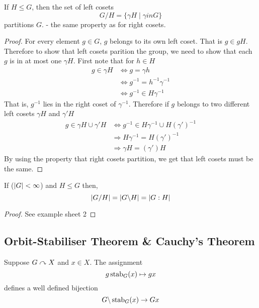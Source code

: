 \documentclass{article}
\begin{document}
\begin{lemma}
    If $H \leq G$, then the set of left cosets
    \[
        G \slash H = \{\gamma H \mid \gamma in G\}  
    \]
    partitions $G$. - the same property as for right cosets.
\end{lemma}

\begin{proof}
    For every element $g \in G$, $g$ belongs to its own left coset. That is $g \in gH$.
    Therefore to show that left cosets parition the group, we need to show that each $g$ is in at most one $\gamma H$.
    First note that for $h \in H $
    \begin{align*}
        g \in \gamma H &\Leftrightarrow g = \gamma h \\
        &\Leftrightarrow g^{-1} = h^{-1} \gamma^{-1} \\
        &\Leftrightarrow g^{-1} \in H\gamma^{-1}
    \end{align*}
    That is, $g^{-1}$ lies in the right coset of $\gamma^{-1}$. Therefore if $g$ belongs to two different left cosets $\gamma H$ and $\gamma' H$
    \begin{align*}
        g \in \gamma H \cup \gamma' H &\Leftrightarrow g^{-1} \in H\gamma^{-1} \cup H(\gamma')^{-1} \\
        &\Rightarrow H\gamma^{-1} = H(\gamma')^{-1} \\
        &\Rightarrow \gamma H = (\gamma') H
    \end{align*}
    By using the property that right cosets partition, we get that left cosets must be the same. 
\end{proof}

\begin{lemma}
    If ($\left\lvert G\right\rvert < \infty$) and $H \leq G$ then,
    \[
        \left\lvert G \slash H\right\rvert = \left\lvert G \backslash H\right\rvert = \left\lvert G : H\right\rvert  
    \]
\end{lemma}

\begin{proof}
    See example sheet 2
\end{proof}

\subsection{Orbit-Stabiliser Theorem \& Cauchy's Theorem}
\begin{thm}
    Suppose $G \curvearrowright X$ and $x \in X$. The assignment
    \[
        g \operatorname{stab}_G(x) \mapsto gx  
    \]
    defines a well defined bijection 
    \[
        G \backslash \operatorname{stab}_G(x) \rightarrow Gx
    \]
\end{thm}
\end{document}
